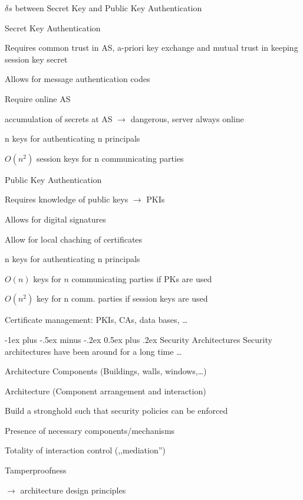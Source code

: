 \documentclass[a4paper]{article}
\makeatletter
\renewcommand{\section}{\@startsection{section}{1}{0mm}%
                {-1ex plus -.5ex minus -.2ex}%
                {0.5ex plus .2ex}%
                {\normalfont\large\bfseries}}
\makeatother
\begin{document}
\begin{multicols}{3}
    $\delta s$ between Secret Key and Public Key Authentication
    \begin{itemize*}
        \item Secret Key Authentication
        \begin{itemize*}
            \item Requires common trust in AS, a-priori key exchange and mutual trust in keeping session key secret
            \item Allows for message authentication codes
            \item Require online AS
            \item accumulation of secrets at AS $\rightarrow$ dangerous, server always online
            \item n keys for authenticating n principals
            \item $O(n^2)$ session keys for n communicating parties
        \end{itemize*}
        \item Public Key Authentication
        \begin{itemize*}
            \item Requires knowledge of public keys $\rightarrow$ PKIs
            \item Allows for digital signatures
            \item Allow for local chaching of certificates
            \item n keys for authenticating n principals
            \item $O(n)$ keys for $n$ communicating parties if PKs are used
            \item $O(n^2)$ key for n comm. parties if session keys are used
            \item Certificate management: PKIs, CAs, data bases, \dots
        \end{itemize*}
    \end{itemize*}

    \section{Security Architectures}
    Security architectures have been around for a long time \dots
    \begin{itemize*}
        \item Architecture Components (Buildings, walls, windows,\dots )
        \item Architecture (Component arrangement and interaction)
        \item Build a stronghold such that security policies can be enforced
        \begin{itemize*}
            \item Presence of necessary components/mechanisms
            \item Totality of interaction control (,,mediation'')
            \item Tamperproofness
            \item[$\rightarrow$] architecture design principles
        \end{itemize*}
    \end{itemize*}


\end{multicols}
\end{document}
